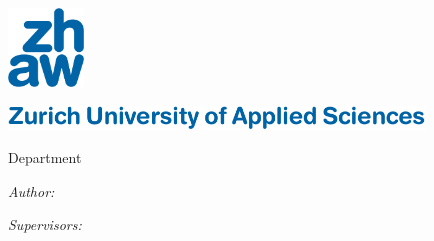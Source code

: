 

\begin{titlepage}

\setlength{\parskip}{0pt}

\begin{center}
\includegraphics[width=0.15\textwidth]{Figures/zhaw_rgb}

\ifxetex
    \vspace{0.6cm}
    {\zhawtitlefont\color{zhawblue}\LARGE \univname\par}   %
    \vspace{0.2cm}
\else
    \vspace{0.87cm}
    {\includegraphics[height=17.9pt]{Figures/zhaw_font_eng_font}\par}
    \vspace{0.05cm}
\fi
{\Large Department \deptname\par}                      %
\vspace{0.2cm}
{\Large \instname\par}                                 %
\vspace{3.5cm}                            
\textsc{\Large \ttype}                                 %
\vspace{0.2cm}
\HRule 
\vspace{0.4cm}
{\huge \bfseries \ttitle\par}                          %
\vspace{0.4cm}  
\HRule
\vspace{1.5cm}

 
\begin{minipage}[t]{0.4\textwidth}
\begin{flushleft} 
    \large
    \emph{Author:}\\
    \authorname
\end{flushleft}
\end{minipage}
\begin{minipage}[t]{0.4\textwidth}
\begin{flushright} 
    \large
    \emph{Supervisors:} \\
    \supnameA \\
    \supnameB
\end{flushright}
\end{minipage}
\vspace{2cm}
 

\end{center}
\end{titlepage}
